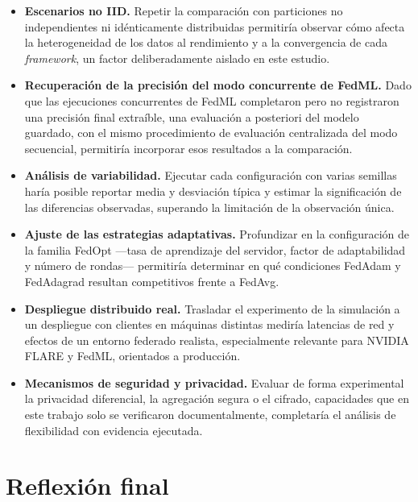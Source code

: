 \begin{itemize}
  \item \textbf{Escenarios no IID.} Repetir la comparación con particiones no
  independientes ni idénticamente distribuidas permitiría observar cómo afecta la
  heterogeneidad de los datos al rendimiento y a la convergencia de cada \textit{framework}, un
  factor deliberadamente aislado en este estudio.

  \item \textbf{Recuperación de la precisión del modo concurrente de FedML.} Dado que
  las ejecuciones concurrentes de FedML completaron pero no registraron una precisión
  final extraíble, una evaluación a posteriori del modelo guardado, con el mismo
  procedimiento de evaluación centralizada del modo secuencial, permitiría incorporar
  esos resultados a la comparación.

  \item \textbf{Análisis de variabilidad.} Ejecutar cada configuración con varias
  semillas haría posible reportar media y desviación típica y estimar la significación
  de las diferencias observadas, superando la limitación de la observación única.

  \item \textbf{Ajuste de las estrategias adaptativas.} Profundizar en la
  configuración de la familia FedOpt —tasa de aprendizaje del servidor, factor de
  adaptabilidad y número de rondas— permitiría determinar en qué condiciones FedAdam y
  FedAdagrad resultan competitivos frente a FedAvg.

  \item \textbf{Despliegue distribuido real.} Trasladar el experimento de la simulación
  a un despliegue con clientes en máquinas distintas mediría latencias de red y efectos
  de un entorno federado realista, especialmente relevante para NVIDIA FLARE y FedML,
  orientados a producción.

  \item \textbf{Mecanismos de seguridad y privacidad.} Evaluar de forma experimental la
  privacidad diferencial, la agregación segura o el cifrado, capacidades que en este
  trabajo solo se verificaron documentalmente, completaría el análisis de flexibilidad
  con evidencia ejecutada.
\end{itemize}

\section{Reflexión final}
\label{sec:reflexion-final}

